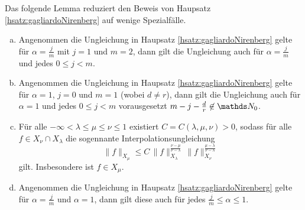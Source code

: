 Das folgende Lemma reduziert den Beweis von Haupsatz \ref{hsatz:gagliardoNirenberg} auf wenige Spezialfälle.

\begin{lem}
  \label{lem:reducingGagliardo}
  \begin{enumerate}[a)]
    \item Angenommen die Ungleichung in Haupsatz \ref{hsatz:gagliardoNirenberg} gelte für $\alpha = \frac{j}{m}$ mit $j = 1$ und $m = 2$, dann gilt die Ungleichung auch für $\alpha = \frac{j}{m}$ und jedes $0 \leq j < m$.

    \item Angenommen die Ungleichung in Haupsatz \ref{hsatz:gagliardoNirenberg} gelte für $\alpha = 1$, $j = 0$ und $m = 1$ (wobei $d \neq r$), dann gilt die Ungleichung auch für $\alpha = 1$ und jedes $0 \leq j < m$ vorausgesetzt $m - j - \frac{d}{r} \not\in \N_0$.
      
    \item Für alle $-\infty < \lambda \leq \mu \leq \nu \leq 1$ existiert $C = C(\lambda, \mu, \nu) > 0$, sodass für alle $f \in X_\nu \cap X_\lambda$ die sogennante Interpolationsungleichung
      $$
      \| f\|_{X_\mu} \leq C \, \|f\|_{X_\lambda}^{\frac{\nu - \mu}{\nu - \lambda}} \, \|f\|_{X_\nu}^{\frac{\mu - \lambda}{\nu - \lambda}}
      $$
      gilt.
      Insbesondere ist $f \in X_\mu$.

    \item Angenommen die Ungleichung in Haupsatz \ref{hsatz:gagliardoNirenberg} gelte für $\alpha = \frac{j}{m}$ und $\alpha = 1$, dann gilt diese auch für jedes $\frac{j}{m} \leq \alpha \leq 1$.
  \end{enumerate}
\end{lem}

